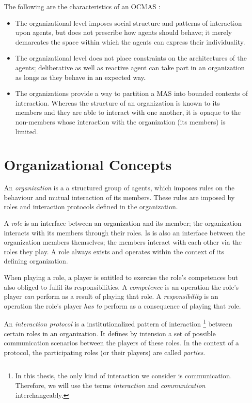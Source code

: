 The following are the characteristics of an OCMAS \cite{Ferber03}:
\begin{itemize}
	\item The organizational level imposes social structure and patterns of interaction upon agents, but does not prescribe how agents should behave; it merely demarcates the space within which the agents can express their individuality.
	\item The organizational level does not place constraints on the architectures of the agents; deliberative as well as reactive agent can take part in an organization as longs as they behave in an expected way.
	\item The organizations provide a way to partition a MAS into bounded contexts of interaction.
	Whereas the structure of an organization is known to its members and they are able to interact with one another, it is opaque to the non-members whose interaction with the organization (its members) is limited.
\end{itemize}

\section{Organizational Concepts}

An \textit{organization} is a a structured group of agents, which imposes rules on the behaviour and mutual interaction of its members. 
These rules are imposed by roles and interaction protocols defined in the organization.

A \textit{role} is an interface between an organization and its member; the organization interacts with its members through their roles.
Is is also an interface between the organization members themselves; the members interact with each other via the roles they play.
A role always exists and operates within the context of its defining organization.

When playing a role, a player is entitled to exercise the role's competences but also obliged to fulfil its responsibilities.
A \textit{competence} is an operation the role's player \textit{can} perform as a result of playing that role.
A \textit{responsibility} is an operation the role's player \textit{has to} perform as a consequence of playing that role.

An \textit{interaction protocol} is a institutionalized pattern of interaction 
\footnote{In this thesis, the only kind of interaction we consider is communication. Therefore, we will use the terms \textit{interaction} and \textit{communication} interchangeably.}
between certain roles in an organization.
It defines by intension a set of possible communication scenarios between the players of these roles.
In the context of a protocol, the participating roles (or their players) are called \textit{parties}.